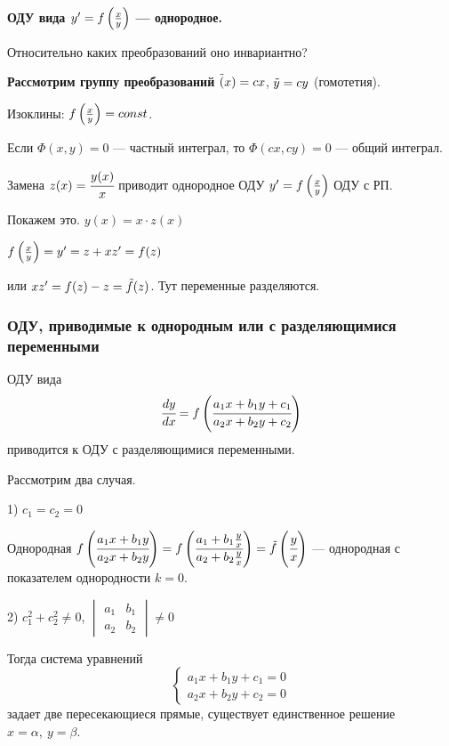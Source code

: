 \textbf{ОДУ вида $y' = f\left({\frac{x}{y}}\right)$ --- однородное.}  \label{3.3.1}

Относительно каких преобразований оно инвариантно?

\textbf{Рассмотрим группу преобразований} $\Tilde(x) = cx$, $\Tilde{y} = cy$ (гомотетия).

Изоклины: $f\left({\frac{x}{y}}\right) = const$.

Если $\Phi(x,y) = 0$ --- частный интеграл, то $\Phi(cx, cy) = 0$ --- общий интеграл.

\begin{prop} 
    Замена $z(x) = \cfrac{y(x)}{x}$ приводит однородное ОДУ $y' = f\left({\frac{x}{y}}\right)$  ОДУ с РП.
\end{prop}

Покажем это. $y(x) = x\cdot z(x)$

$f\left({\frac{x}{y}}\right) = y' = z + xz' = f(z)$

или $xz' = f(z) - z = \Tilde{f}(z)$. Тут переменные разделяются.

\subsubsection{ОДУ, приводимые к однородным или с разделяющимися переменными}

\begin{prop}
    ОДУ вида
    \begin{equation}\label{3.4.1}
        \cfrac{dy}{dx}= f\left({\cfrac{a_1x+b_1y+c_1}{a_2x+b_2y+c_2}}\right)
    \end{equation} приводится к ОДУ с разделяющимися переменными.
\end{prop}

Рассмотрим два случая.
\vspace{5mm}

1) $c_1 = c_2 = 0$

Однородная $f\left({\cfrac{a_1x+b_1y}{a_2x+b_2y}}\right) = f\left({\cfrac{a_1+b_1\frac{y}{x}}{a_2+b_2\frac{y}{x}}}\right) = \Tilde{f}\left({\cfrac{y}{x}}\right)$ --- однородная с показателем однородности $k = 0$.
\vspace{3mm}

2) $c_1^2+c_2^2 \neq 0$,
$\begin{vmatrix}
  a_1& b_1\\
  a_2& b_2
\end{vmatrix} \neq 0$

Тогда система уравнений  \begin{equation*}
        \begin{cases}
        a_1x+b_1y+c_1=0
        \\
        a_2x+b_2y+c_2=0
        \end{cases}
    \end{equation*} задает две пересекающиеся прямые, существует единственное решение $x = \alpha, \ y = \beta$.
    

